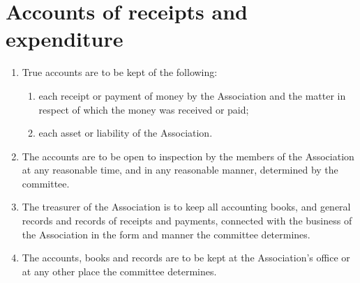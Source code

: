 \section{Accounts of receipts and expenditure}
\label{rule:accounts}

\begin{enumerate}
	\item True accounts are to be kept of the following:
	\begin{enumerate}
		\item each receipt or payment of money by the Association and the matter in respect of which the money was received or paid;
		\item each asset or liability of the Association.
	\end{enumerate}
	
	\item The accounts are to be open to inspection by the members of the Association at any reasonable time, and in any reasonable manner, determined by the committee.
	\item The treasurer of the Association is to keep all accounting books, and general records and records of receipts and payments, connected with the business of the Association in the form and manner the committee determines.
	\item The accounts, books and records are to be kept at the Association's office or at any other place the committee determines.
\end{enumerate}